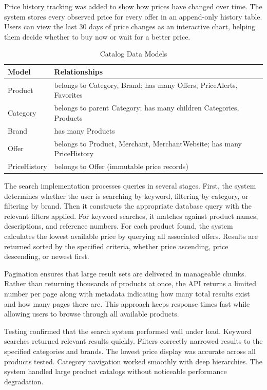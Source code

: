 Price history tracking was added to show how prices have changed
over time. The system stores every observed price for every
offer in an append-only history table. Users can view the last
30 days of price changes as an interactive chart, helping them
decide whether to buy now or wait for a better price.

\begin{table}[H]
\begin{center}
\begin{tabular}{|m{3cm}|m{6cm}|}
\hline
\textbf{Model} & \textbf{Relationships} \\ \hline
Product & belongs to Category, Brand; has many Offers, PriceAlerts, Favorites \\ \hline
Category & belongs to parent Category; has many children Categories, Products \\ \hline
Brand & has many Products \\ \hline
Offer & belongs to Product, Merchant, MerchantWebsite; has many PriceHistory \\ \hline
PriceHistory & belongs to Offer (immutable price records) \\ \hline
\end{tabular}
\caption{Catalog Data Models}
\label{tab:catalog_models}
\end{center}
\end{table}

The search implementation processes queries in several stages.
First, the system determines whether the user is searching by
keyword, filtering by category, or filtering by brand. Then it
constructs the appropriate database query with the relevant
filters applied. For keyword searches, it matches against product
names, descriptions, and reference numbers. For each product
found, the system calculates the lowest available price by
querying all associated offers. Results are returned sorted by
the specified criteria, whether price ascending, price descending,
or newest first.

Pagination ensures that large result sets are delivered in
manageable chunks. Rather than returning thousands of products
at once, the API returns a limited number per page along with
metadata indicating how many total results exist and how many
pages there are. This approach keeps response times fast while
allowing users to browse through all available products.

Testing confirmed that the search system performed well under
load. Keyword searches returned relevant results quickly.
Filters correctly narrowed results to the specified categories
and brands. The lowest price display was accurate across all
products tested. Category navigation worked smoothly with
deep hierarchies. The system handled large product catalogs
without noticeable performance degradation.

